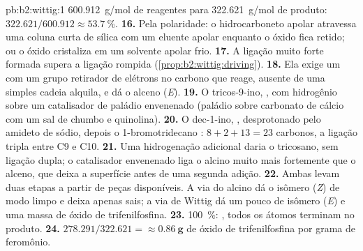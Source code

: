 \begin{solution}{pb:b2:wittig:1}
\qty{600.912}{g/mol} de reagentes para \qty{322.621}{g/mol} de produto: $322.621/600.912 \approx
53.7~\%$.
\textbf{16.} Pela polaridade: o hidrocarboneto apolar atravessa uma coluna curta de sílica com um
eluente apolar enquanto o óxido fica retido; ou o óxido cristaliza em um solvente apolar frio.
\textbf{17.} A ligação  muito forte formada supera a ligação  rompida
(\cref{prop:b2:wittig:driving}).
\textbf{18.} Ela exige um  com um grupo retirador de elétrons no carbono que reage, ausente
de uma simples cadeia alquila, e dá o alceno (\textit{E}).
\textbf{19.} O tricos-9-ino, , com hidrogênio sobre um catalisador de paládio
envenenado (paládio sobre carbonato de cálcio com um sal de chumbo e quinolina).
\textbf{20.} O dec-1-ino, , desprotonado pelo amideto de sódio, depois o 1-bromotridecano
: $8 + 2 + 13 = 23$ carbonos, a ligação tripla entre C9 e C10.
\textbf{21.} Uma hidrogenação adicional daria o tricosano, sem ligação dupla; o catalisador envenenado
liga o alcino muito mais fortemente que o alceno, que deixa a superfície antes de uma segunda adição.
\textbf{22.} Ambas levam duas etapas a partir de peças disponíveis. A via do alcino dá o isômero
(\textit{Z}) de modo limpo e deixa apenas sais; a via de Wittig dá um pouco de isômero (\textit{E}) e
uma massa de óxido de trifenilfosfina.
\textbf{23.} 100~\%: , todos os átomos terminam no produto.
\textbf{24.} $278.291/322.621 = \boldsymbol{\approx \qty{0.86}{g}}$ de óxido de trifenilfosfina por
grama de feromônio.
\end{solution}
